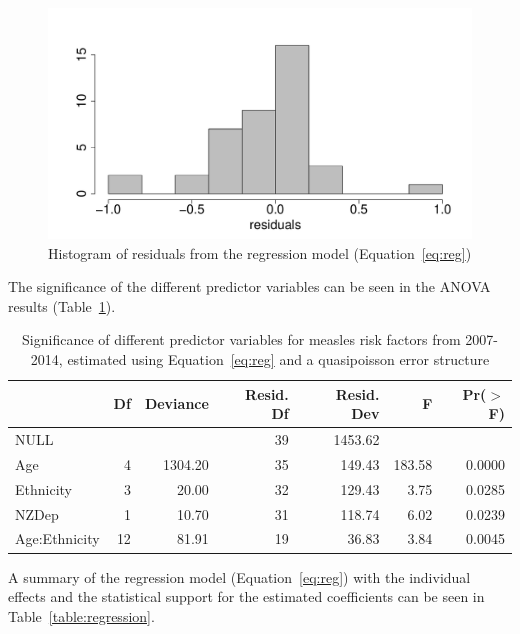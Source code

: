 \documentclass{article}
\begin{document}
\begin{itemize}
\begin{figure}
\begin{center}
\includegraphics{draftfinalreport-017}
\end{center}
\caption{Histogram of residuals from the regression model (Equation~\ref{eq:reg})}
\label{fig:resid}
\end{figure}

The significance of the different predictor variables can be seen in the ANOVA results (Table~\ref{table:anova}).
\par
\vspace{5mm} %
\begin{table}
\begin{tabular}{lrrrrrr}
  \hline
 & Df & Deviance & Resid. Df & Resid. Dev & F & Pr($>$F) \\ 
  \hline
NULL &  &  & 39 & 1453.62 &  &  \\ 
  Age & 4 & 1304.20 & 35 & 149.43 & 183.58 & 0.0000 \\ 
  Ethnicity & 3 & 20.00 & 32 & 129.43 & 3.75 & 0.0285 \\ 
  NZDep & 1 & 10.70 & 31 & 118.74 & 6.02 & 0.0239 \\ 
  Age:Ethnicity & 12 & 81.91 & 19 & 36.83 & 3.84 & 0.0045 \\ 
   \hline
\end{tabular}\caption{Significance of different predictor variables for measles risk factors from 2007-2014, estimated using Equation~\ref{eq:reg} and a quasipoisson error structure}
\label{table:anova}
\end{table}
\vspace{5mm} %
A summary of the regression model (Equation~\ref{eq:reg}) with the individual effects and the statistical support for the estimated coefficients can be seen in Table~\ref{table:regression}.


\end{itemize}
\end{document}
